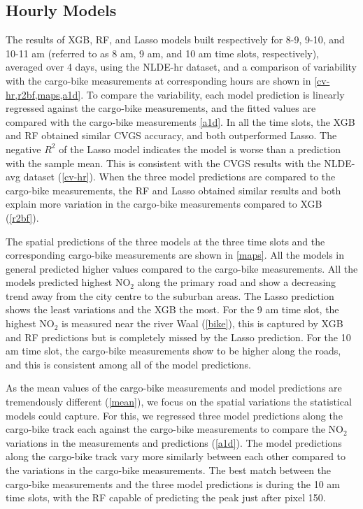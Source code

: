\documentclass{article}
\begin{document}
 
\subsection{Hourly Models}
The results of XGB, RF, and Lasso models built respectively for 8-9, 9-10, and 10-11 am (referred to as 8 am, 9 am, and 10 am time slots, respectively), averaged over 4 days, using the NLDE-hr dataset, and a comparison of variability with the cargo-bike measurements at corresponding hours are shown in \cref{cv-hr,r2bf,maps,a1d}. To compare the variability, each model prediction is linearly regressed against the cargo-bike measurements, and the fitted values are compared with the cargo-bike measurements \cref{a1d}. In all the time slots, the XGB and RF obtained similar CVGS accuracy, and both outperformed Lasso. The negative $R^2$ of the Lasso model indicates the model is worse than a prediction with the sample mean. This is consistent with the CVGS results with the NLDE-avg dataset (\cref{cv-hr}). When the three model predictions are compared to the cargo-bike measurements, the RF and Lasso obtained similar results and both explain more variation in the cargo-bike measurements compared to XGB (\cref{r2bf}).  
 
 The spatial predictions of the three models at the three time slots and the corresponding cargo-bike measurements are shown in \cref{maps}. All the models in general predicted higher values compared to the cargo-bike measurements. All the models predicted highest NO$_2$ along the primary road and show a decreasing trend away from the city centre to the suburban areas. The Lasso prediction shows the least variations and the XGB the most. For the 9 am time slot, the highest NO$_2$ is measured near the river Waal (\cref{bike}), this is captured by XGB and RF predictions but is completely missed by the Lasso prediction. For the 10 am time slot, the cargo-bike measurements show to be higher along the roads, and this is consistent among all of the model predictions.  
 
 As the mean values of the cargo-bike measurements and model predictions are tremendously different (\cref{mean}), we focus on the spatial variations the statistical models could capture. For this, we regressed three model predictions along the cargo-bike track each against the cargo-bike measurements to compare the NO$_2$ variations in the measurements and predictions (\cref{a1d}). The model predictions along the cargo-bike track vary more similarly between each other compared to the variations in the cargo-bike measurements. The best match between the cargo-bike measurements and the three model predictions is during the 10 am time slots, with the RF capable of predicting the peak just after pixel 150.  
 
\end{document}
